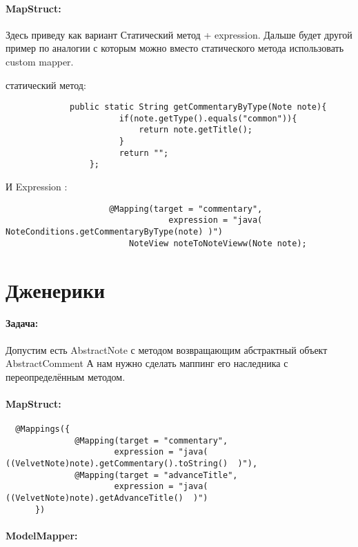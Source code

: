 \documentclass{article}
\begin{document}
  \paragraph{MapStruct:}
  
     Здесь приведу как вариант Статический метод + expression.  Дальше будет другой пример по аналогии с которым можно вместо статического метода
     использовать custom mapper.
     
     статический метод:
   \begin{lstlisting} 
             public static String getCommentaryByType(Note note){
                       if(note.getType().equals("common")){
                           return note.getTitle();
                       }
                       return "";
                 };
        \end{lstlisting}  
     И Expression :   
   \begin{lstlisting} 
                     @Mapping(target = "commentary",
                                 expression = "java(  NoteConditions.getCommentaryByType(note) )")
                         NoteView noteToNoteVieww(Note note);
   \end{lstlisting}  
   
\section{Дженерики} 
 \paragraph{Задача:}
  Допустим есть AbstractNote с методом возвращающим абстрактный объект AbstractComment
  А нам нужно сделать маппинг его наследника с переопределённым методом.
  
  \paragraph{MapStruct:}
   \begin{lstlisting} 
  @Mappings({
              @Mapping(target = "commentary",
                      expression = "java( ((VelvetNote)note).getCommentary().toString()  )"),
              @Mapping(target = "advanceTitle",
                      expression = "java( ((VelvetNote)note).getAdvanceTitle()  )")
      })
      \end{lstlisting} 
  \paragraph{ModelMapper:}
  
\end{document}
